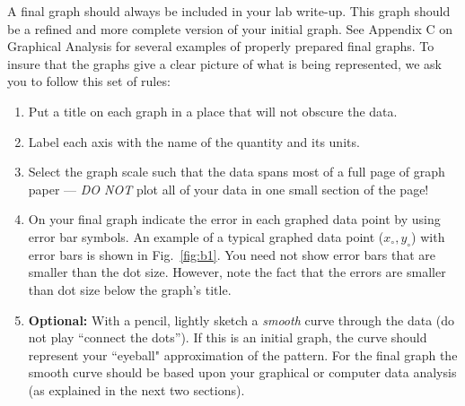      A final graph should always be included in your lab
write-up.  This graph should be a refined and more complete
version of your initial graph.  See Appendix C on Graphical Analysis for
several examples of properly prepared final graphs.  To insure that the
graphs give a clear picture of what is being represented, we ask
you to follow this set of rules:
\begin{enumerate}
\item Put a title on each graph in a place that will not
           obscure the data.
\item Label each axis with the name of the quantity and its
           units.
\item Select the graph scale such that the data spans most of
           a full page of graph paper --- {\em DO NOT} plot all of your
           data in one small section of the page!
\item On your final graph indicate the error in each graphed
           data point by using error bar symbols.
           An example of a typical graphed data point ($x_{\circ},y_{\circ}$)
           with error bars is shown in Fig.~\ref{fig:b1}.
           You need not show error bars that are smaller than the
           dot size.  However, note the fact that the errors are
           smaller than dot size below the graph's title.
\item {\bf Optional:}  With a pencil, lightly sketch a {\em smooth}
           curve through the data (do not play
           ``connect the dots'').  If this is an initial graph, the
           curve should represent your ``eyeball" approximation
           of the pattern.  For the final graph the smooth curve
           should be based upon your graphical or computer data
           analysis (as explained in the next two sections).
\end{enumerate}

